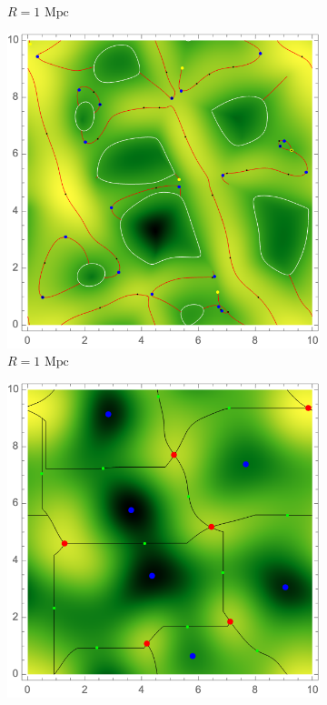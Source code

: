 \documentclass[a4paper, 11pt]{article}
\begin{document}
\begin{figure}
\begin{subfigure}[b]{0.3\textwidth}
\caption{$R=1\text{ Mpc}$}
\label{fig:}
\end{subfigure}
\begin{subfigure}[b]{0.3\textwidth}
\includegraphics[width=\textwidth]{ScaleR=100_skelet}
\caption{$R=1\text{ Mpc}$}
\label{fig:}
\end{subfigure}
\begin{subfigure}[b]{0.3\textwidth}
\includegraphics[width=\textwidth]{ScaleR=100_delta}

\end{subfigure}
\end{figure}
\end{document}
